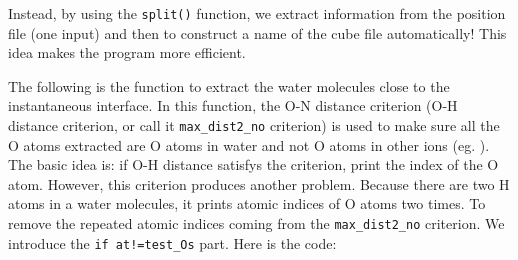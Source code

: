 Instead, by using the \texttt{split()} function, we extract information from the position file (one input) and then to construct a name of the cube file automatically! This idea makes the program more efficient.

The following is the function to extract the water molecules close to the instantaneous interface. In this function, the O-N distance criterion (O-H distance criterion, or call it \texttt{max\_dist2\_no} criterion) is used to make sure all the O atoms extracted are O atoms in water and not O atoms in other ions (eg. \nitrate). 
The basic idea is: if O-H distance satisfys the criterion, print the index of the O atom.
However, this criterion produces another problem. Because there are two H atoms in a water molecules, it prints atomic indices of O atoms two times.
To remove the repeated atomic indices coming from the \texttt{max\_dist2\_no} criterion. We introduce the \texttt{if at!=test\_Os} part. Here is the code:
\lstset{language=Python}
